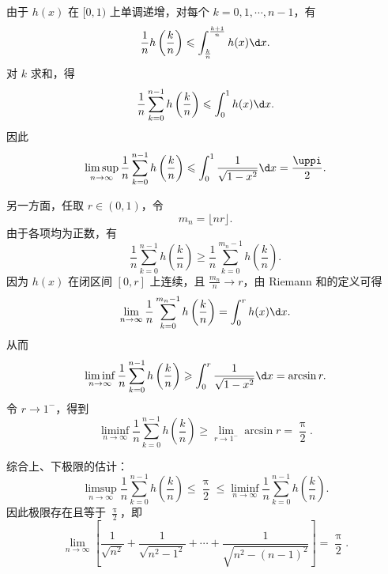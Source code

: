 \begin{solution}
    由于 $h(x)$ 在 $[0, 1)$ 上单调递增，对每个
    $k = 0, 1, \cdots, n - 1$，有
    \begin{equation}
        \frac{1}{n}h\left(\frac{k}{n}\right)
        \leqslant
        \int_{\frac{k}{n}}^{\frac{k+1}{n}} h(x)\d x.
    \end{equation}
    对 $k$ 求和，得
    \begin{equation}
        \frac{1}{n}\sum_{k=0}^{n-1}h\left(\frac{k}{n}\right)
        \leqslant
        \int_0^1 h(x)\d x.
    \end{equation}
    因此
    \begin{equation}
        \limsup_{n\to\infty}
        \frac{1}{n}\sum_{k=0}^{n-1}h\left(\frac{k}{n}\right)
        \leqslant
        \int_0^1 \frac{1}{\sqrt{1-x^2}}\d x
        = \frac{\uppi}{2}.
    \end{equation}

    另一方面，任取 $r \in (0, 1)$，令
    \begin{equation}
        m_n = \lfloor nr \rfloor.
    \end{equation}
    由于各项均为正数，有
    \begin{equation}
        \frac{1}{n}\sum_{k=0}^{n-1}h\left(\frac{k}{n}\right)
        \geqslant
        \frac{1}{n}\sum_{k=0}^{m_n-1}h\left(\frac{k}{n}\right).
    \end{equation}
    因为 $h(x)$ 在闭区间 $[0, r]$ 上连续，且
    $\frac{m_n}{n}\to r$，由 Riemann 和的定义可得
    \begin{equation}
        \lim_{n\to\infty}
        \frac{1}{n}\sum_{k=0}^{m_n-1}h\left(\frac{k}{n}\right)
        =
        \int_0^r h(x)\d x.
    \end{equation}
    从而
    \begin{equation}
        \liminf_{n\to\infty}
        \frac{1}{n}\sum_{k=0}^{n-1}h\left(\frac{k}{n}\right)
        \geqslant
        \int_0^r \frac{1}{\sqrt{1-x^2}}\d x
        = \arcsin r.
    \end{equation}
    令 $r\to1^-$，得到
    \begin{equation}
        \liminf_{n\to\infty}
        \frac{1}{n}\sum_{k=0}^{n-1}h\left(\frac{k}{n}\right)
        \geqslant
        \lim_{r\to1^-}\arcsin r
        = \frac{\uppi}{2}.
    \end{equation}

    综合上、下极限的估计：
    \begin{equation}
        \limsup_{n\to\infty}
        \frac{1}{n}\sum_{k=0}^{n-1}h\left(\frac{k}{n}\right)
        \leqslant \frac{\uppi}{2}
        \leqslant
        \liminf_{n\to\infty}
        \frac{1}{n}\sum_{k=0}^{n-1}h\left(\frac{k}{n}\right).
    \end{equation}
    因此极限存在且等于 $\frac{\uppi}{2}$，即
    \begin{equation}
        \boxed{
            \lim_{n\to\infty}
            \left[
                \frac{1}{\sqrt{n^2}}
                + \frac{1}{\sqrt{n^2 - 1^2}}
                + \cdots
                + \frac{1}{\sqrt{n^2 - (n-1)^2}}
                \right]
            = \frac{\uppi}{2}.
        }
    \end{equation}


\end{solution}

